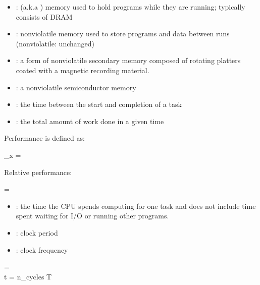 \begin{itemize}
    \item {}: (a.k.a ) memory used to hold
      programs while they are running; typically consists of DRAM
    
    \item {}: nonviolatile memory used to store programs and data
      between runs (nonviolatile: unchanged)

    \item {}: a form of nonviolatile secondary memory
      composed of rotating platters coated with a magnetic recording material.

    \item {}: a nonviolatile semiconductor memory
  \end{itemize}


    \begin{itemize}
      \item {}: the time between the start and completion of a task
      \item {}: the total amount of work done in a given
        time
    \end{itemize}

    \par Performance is defined as:
    \begin{eqbox}
      _x = 
    \end{eqbox}
    \par Relative performance:
    \begin{eqbox}
       =  
    \end{eqbox}

    \begin{itemize}
      \item {}: the time the CPU spends computing
        for one task and does not include time spent waiting for I/O or running
        other programs.
      \item {}: clock period
      \item {}: clock frequency
    \end{itemize}
    
    \begin{eqbox}
       =  \times {} \\
      t = n_{cycles} \times T
    \end{eqbox}

